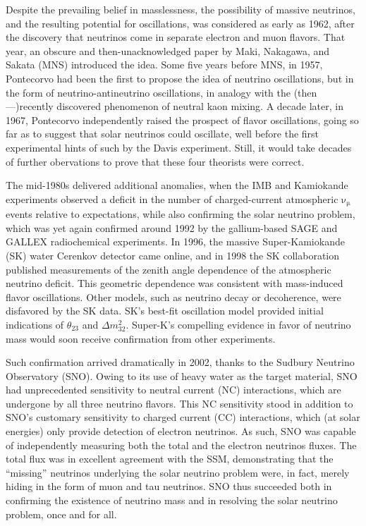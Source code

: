 \documentclass[../thesis.tex]{subfiles}
\begin{document}
Despite the prevailing belief in masslessness, the possibility of massive
neutrinos, and the resulting potential for oscillations, was considered as early
as 1962, after the discovery that neutrinos come in separate electron and muon
flavors. That year, an obscure and then-unacknowledged paper by Maki, Nakagawa,
and Sakata (MNS) introduced the idea. Some five years before MNS, in 1957,
Pontecorvo had been the first to propose the idea of neutrino oscillations, but
in the form of neutrino-antineutrino oscillations, in analogy with the
(then---)recently discovered phenomenon of neutral kaon mixing. A decade later,
in 1967, Pontecorvo independently raised the prospect of flavor oscillations,
going so far as to suggest that solar neutrinos could oscillate, well before the
first experimental hints of such by the Davis experiment. Still, it would take
decades of further obervations to prove that these four theorists were correct.

The mid-1980s delivered additional anomalies, when the IMB and Kamiokande
experiments observed a deficit in the number of charged-current atmospheric
\(\mathrm{\nu_\mu}\) events relative to expectations, while also confirming the
solar neutrino problem, which was yet again confirmed around 1992 by the
gallium-based SAGE and GALLEX radiochemical experiments. In 1996, the massive
Super-Kamiokande (SK) water Cerenkov detector came online, and in 1998 the SK
collaboration published measurements of the zenith angle dependence of the
atmospheric neutrino deficit. This geometric dependence was consistent with
mass-induced flavor oscillations. Other models, such as neutrino decay or
decoherence, were disfavored by the SK data. SK's best-fit oscillation model
provided initial indications of \(\theta_{23}\) and \(\Delta
m^2_{32}\). Super-K's compelling evidence in favor of neutrino mass would soon
receive confirmation from other experiments.

Such confirmation arrived dramatically in 2002, thanks to the Sudbury Neutrino
Observatory (SNO). Owing to its use of heavy water as the target material, SNO
had unprecedented sensitivity to neutral current (NC) interactions, which are
undergone by all three neutrino flavors. This NC sensitivity stood in addition
to SNO's customary sensitivity to charged current (CC) interactions, which (at
solar energies) only provide detection of electron neutrinos. As such, SNO was
capable of independently measuring both the total and the electron neutrinos
fluxes. The total flux was in excellent agreement with the SSM, demonstrating
that the ``missing'' neutrinos underlying the solar neutrino problem were, in
fact, merely hiding in the form of muon and tau neutrinos. SNO thus succeeded
both in confirming the existence of neutrino mass and in resolving the solar
neutrino problem, once and for all.
\end{document}
